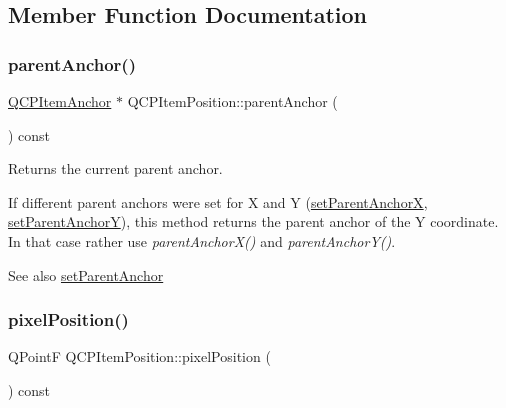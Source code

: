 \subsection{Member Function Documentation}
\mbox{\label{classQCPItemPosition_a0a87f9dce1af6cc9b510785991bcf1c6}} 
\subsubsection{\texorpdfstring{parent\+Anchor()}{parentAnchor()}}
{\footnotesize\ttfamily \hyperlink{classQCPItemAnchor}{Q\+C\+P\+Item\+Anchor} $\ast$ Q\+C\+P\+Item\+Position\+::parent\+Anchor (\begin{DoxyParamCaption}{ }\end{DoxyParamCaption}) const\hspace{0.3cm}{\ttfamily [inline]}}

Returns the current parent anchor.

If different parent anchors were set for X and Y (\hyperlink{classQCPItemPosition_add71461a973927c74e42179480916d9c}{set\+Parent\+AnchorX}, \hyperlink{classQCPItemPosition_add5ec1db9d19cec58a3b5c9e0a0c3f9d}{set\+Parent\+AnchorY}), this method returns the parent anchor of the Y coordinate. In that case rather use {\itshape parent\+Anchor\+X()} and {\itshape parent\+Anchor\+Y()}.

\begin{DoxySeeAlso}{See also}
\hyperlink{classQCPItemPosition_ac094d67a95d2dceafa0d50b9db3a7e51}{set\+Parent\+Anchor} 
\end{DoxySeeAlso}
\mbox{\label{classQCPItemPosition_a8be9a4787635433edecc75164beb748d}} 
\subsubsection{\texorpdfstring{pixel\+Position()}{pixelPosition()}}
{\footnotesize\ttfamily Q\+PointF Q\+C\+P\+Item\+Position\+::pixel\+Position (\begin{DoxyParamCaption}{ }\end{DoxyParamCaption}) const\hspace{0.3cm}{\ttfamily [virtual]}}

